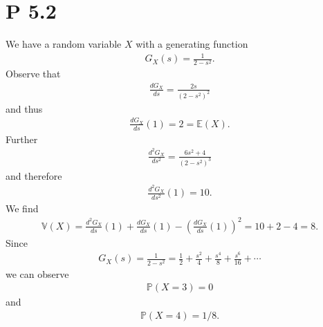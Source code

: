 \documentclass{article}
\renewcommand{\P}{\mathbb{P}}
\newcommand{\E}{\mathbb{E}}
\newcommand{\V}{\mathbb{V}}
\begin{document}
\section{P 5.2}
We have a random variable $X$ with a generating function 
\begin{align*}
  G_X(s) = \frac{1}{2-s^2}.
\end{align*}
Observe that
\begin{align*}
  \frac{dG_X}{ds} = \frac{2s}{(2-s^2)^2}
\end{align*}
and thus
\begin{align*}
  \frac{dG_X}{ds}(1) = 2 = \E(X).
\end{align*}
Further
\begin{align*}
  \frac{d^2G_X}{ds^2}=\frac{6s^2+4}{(2-s^2)^3}
\end{align*}
and therefore
\begin{align*}
  \frac{d^2G_X}{ds^2}(1) = 10.
\end{align*}
We find
\begin{align*}
  \V(X) = \frac{d^2G_X}{ds}(1) + \frac{dG_X}{ds}(1) - \left(\frac{dG_X}{ds}(1)\right)^2
  = 10 + 2 - 4 = 8.
\end{align*}
Since
\begin{align*}
  G_X(s) = \frac{1}{2-s^2} = \frac{1}{2} + \frac{s^2}{4} + \frac{s^4}{8} + \frac{s^6}{16} + \cdots
\end{align*}
we can observe
\begin{align*}
  \P(X=3) = 0
\end{align*}
and
\begin{align*}
  \P(X=4) = 1/8.
\end{align*}
\end{document}
